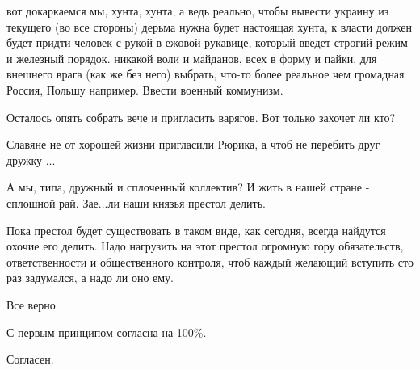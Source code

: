 \begin{itemize}

вот докаркаемся мы, хунта, хунта, а ведь реально, чтобы вывести украину из
текущего (во все стороны) дерьма нужна будет настоящая хунта, к власти должен
будет придти человек с рукой в ежовой рукавице, который введет строгий режим и
железный порядок. никакой воли и майданов, всех в форму и пайки. для внешнего
врага (как же без него) выбрать, что-то более реальное чем громадная Россия,
Польшу например. Ввести военный коммунизм.


Осталось опять собрать вече и пригласить варягов. Вот только захочет ли кто?

Славяне не от хорошей жизни пригласили Рюрика, а чтоб не перебить друг дружку ...

А мы, типа, дружный и сплоченный коллектив? И жить в нашей стране - сплошной рай. Зае...ли наши князья престол делить.


Пока престол будет существовать в таком виде, как сегодня, всегда найдутся
охочие его делить. Надо нагрузить на этот престол огромную гору обязательств,
ответственности и общественного контроля, чтоб каждый желающий вступить сто раз
задумался, а надо ли оно ему.

Все верно

С первым принципом согласна на 100\%.

Согласен.


\end{itemize} %
